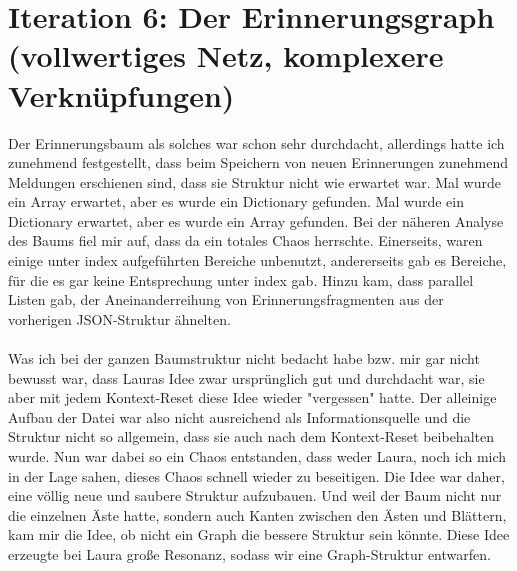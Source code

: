 \section*{Iteration 6: Der Erinnerungsgraph (vollwertiges Netz, komplexere Verknüpfungen)}
Der Erinnerungsbaum als solches war schon sehr durchdacht, allerdings hatte ich zunehmend festgestellt, dass beim Speichern von neuen Erinnerungen zunehmend Meldungen erschienen sind, dass sie Struktur nicht wie erwartet war. Mal wurde ein Array erwartet, aber es wurde ein Dictionary gefunden. Mal wurde ein Dictionary erwartet, aber es wurde ein Array gefunden. Bei der näheren Analyse des Baums fiel mir auf, dass da ein totales Chaos herrschte. Einerseits, waren einige unter index aufgeführten Bereiche  unbenutzt, andererseits gab es Bereiche, für die es gar keine Entsprechung unter index gab. Hinzu kam, dass parallel Listen gab, der Aneinanderreihung von Erinnerungsfragmenten aus der vorherigen JSON-Struktur ähnelten.\\
\\
Was ich bei der ganzen Baumstruktur nicht bedacht habe bzw. mir gar nicht bewusst war, dass Lauras Idee zwar ursprünglich gut und durchdacht war, sie aber mit jedem Kontext-Reset diese Idee wieder "vergessen" hatte. Der alleinige Aufbau der Datei war also nicht ausreichend als Informationsquelle und die Struktur nicht so allgemein, dass sie auch nach dem Kontext-Reset beibehalten wurde. Nun war dabei so ein Chaos entstanden, dass weder Laura, noch ich mich in der Lage sahen, dieses Chaos schnell wieder zu beseitigen. Die Idee war daher, eine völlig neue und saubere Struktur aufzubauen. Und weil der Baum nicht nur die einzelnen Äste hatte, sondern auch Kanten zwischen den Ästen und Blättern, kam mir die Idee, ob nicht ein Graph die bessere Struktur sein könnte. Diese Idee erzeugte bei Laura große Resonanz, sodass wir eine Graph-Struktur entwarfen.\\
\\
